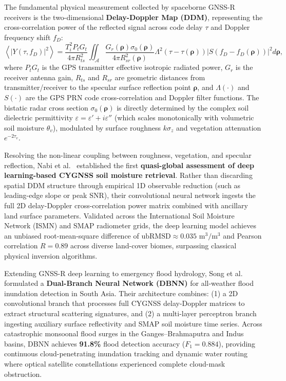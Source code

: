 The fundamental physical measurement collected by spaceborne GNSS-R receivers is the two-dimensional \textbf{Delay-Doppler Map (DDM)}, representing the cross-correlation power of the reflected signal across code delay $\tau$ and Doppler frequency shift $f_D$:
\begin{equation}
    \left\langle |Y(\tau, f_D)|^2 \right\rangle = \frac{T_i^2 P_t G_t}{4\pi R_{ts}^2} \iint_{\mathcal{A}} \frac{G_r(\boldsymbol{\rho}) \sigma_0(\boldsymbol{\rho})}{4\pi R_{sr}^2(\boldsymbol{\rho})} \Lambda^2(\tau - \tau(\boldsymbol{\rho})) |S(f_D - f_D(\boldsymbol{\rho}))|^2 d\boldsymbol{\rho},
    \label{eq:bistatic_ddm}
\end{equation}
where $P_t G_t$ is the GPS transmitter effective isotropic radiated power, $G_r$ is the receiver antenna gain, $R_{ts}$ and $R_{sr}$ are geometric distances from transmitter/receiver to the specular surface reflection point $\boldsymbol{\rho}$, and $\Lambda(\cdot)$ and $S(\cdot)$ are the GPS PRN code cross-correlation and Doppler filter functions. The bistatic radar cross section $\sigma_0(\boldsymbol{\rho})$ is directly determined by the complex soil dielectric permittivity $\varepsilon = \varepsilon' + i\varepsilon''$ (which scales monotonically with volumetric soil moisture $\theta_v$), modulated by surface roughness $k\sigma_z$ and vegetation attenuation $e^{-2\tau_v}$.

Resolving the non-linear coupling between roughness, vegetation, and specular reflection, Nabi et al.~\cite{nabi2023quasiglobal} established the first \textbf{quasi-global assessment of deep learning-based CYGNSS soil moisture retrieval}. Rather than discarding spatial DDM structure through empirical 1D observable reduction (such as leading-edge slope or peak SNR), their convolutional neural network ingests the full 2D delay-Doppler cross-correlation power matrix combined with ancillary land surface parameters. Validated across the International Soil Moisture Network (ISMN) and SMAP radiometer grids, the deep learning model achieves an unbiased root-mean-square difference of $\text{ubRMSD} \approx 0.035\text{ m}^3/\text{m}^3$ and Pearson correlation $R = 0.89$ across diverse land-cover biomes, surpassing classical physical inversion algorithms.

Extending GNSS-R deep learning to emergency flood hydrology, Song et al.~\cite{song2022dualbranch} formulated a \textbf{Dual-Branch Neural Network (DBNN)} for all-weather flood inundation detection in South Asia. Their architecture combines: (1) a 2D convolutional branch that processes full CYGNSS delay-Doppler matrices to extract structural scattering signatures, and (2) a multi-layer perceptron branch ingesting auxiliary surface reflectivity and SMAP soil moisture time series. Across catastrophic monsoonal flood surges in the Ganges--Brahmaputra and Indus basins, DBNN achieves \textbf{91.8\%} flood detection accuracy ($F_1 = 0.884$), providing continuous cloud-penetrating inundation tracking and dynamic water routing where optical satellite constellations experienced complete cloud-mask obstruction.

